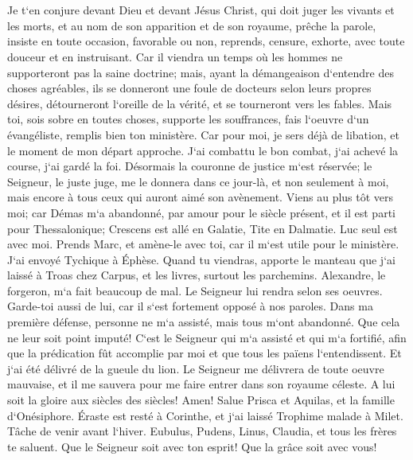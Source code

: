\chapter{}

\verse Je t`en conjure devant Dieu et devant Jésus Christ, qui doit juger les vivants et les morts, et au nom de son apparition et de son royaume, 
\verse prêche la parole, insiste en toute occasion, favorable ou non, reprends, censure, exhorte, avec toute douceur et en instruisant. 
\verse Car il viendra un temps où les hommes ne supporteront pas la saine doctrine; mais, ayant la démangeaison d`entendre des choses agréables, ils se donneront une foule de docteurs selon leurs propres désires, 
\verse détourneront l`oreille de la vérité, et se tourneront vers les fables. 
\verse Mais toi, sois sobre en toutes choses, supporte les souffrances, fais l`oeuvre d`un évangéliste, remplis bien ton ministère. 
\verse Car pour moi, je sers déjà de libation, et le moment de mon départ approche. 
\verse J`ai combattu le bon combat, j`ai achevé la course, j`ai gardé la foi. 
\verse Désormais la couronne de justice m`est réservée; le Seigneur, le juste juge, me le donnera dans ce jour-là, et non seulement à moi, mais encore à tous ceux qui auront aimé son avènement. 
\verse Viens au plus tôt vers moi; 
\verse car Démas m`a abandonné, par amour pour le siècle présent, et il est parti pour Thessalonique; Crescens est allé en Galatie, Tite en Dalmatie. 
\verse Luc seul est avec moi. Prends Marc, et amène-le avec toi, car il m`est utile pour le ministère. 
\verse J`ai envoyé Tychique à Éphèse. 
\verse Quand tu viendras, apporte le manteau que j`ai laissé à Troas chez Carpus, et les livres, surtout les parchemins. 
\verse Alexandre, le forgeron, m`a fait beaucoup de mal. Le Seigneur lui rendra selon ses oeuvres. 
\verse Garde-toi aussi de lui, car il s`est fortement opposé à nos paroles. 
\verse Dans ma première défense, personne ne m`a assisté, mais tous m`ont abandonné. Que cela ne leur soit point imputé! 
\verse C`est le Seigneur qui m`a assisté et qui m`a fortifié, afin que la prédication fût accomplie par moi et que tous les païens l`entendissent. Et j`ai été délivré de la gueule du lion. 
\verse Le Seigneur me délivrera de toute oeuvre mauvaise, et il me sauvera pour me faire entrer dans son royaume céleste. A lui soit la gloire aux siècles des siècles! Amen! 
\verse Salue Prisca et Aquilas, et la famille d`Onésiphore. 
\verse Éraste est resté à Corinthe, et j`ai laissé Trophime malade à Milet. 
\verse Tâche de venir avant l`hiver. Eubulus, Pudens, Linus, Claudia, et tous les frères te saluent. 
\verse Que le Seigneur soit avec ton esprit! Que la grâce soit avec vous! 
